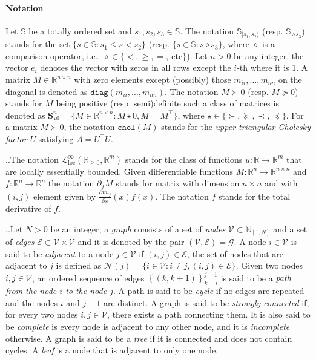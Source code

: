 \documentclass[10pt,twocolumn,twoside]{IEEEtran}
\newcounter{para}
\newcommand\mypara{\par \thesection.\refstepcounter{para}\thepara.\space}
\theoremstyle{plain}
\theoremstyle{definition}
\theoremstyle{remark}
\begin{document}
\paragraph{Notation} Let $\mathbb{S}$ be a totally ordered set and $s_1,s_2,s_3\in\mathbb{S}$. The notation $\mathbb{S}_{[s_1,s_2)}$ (resp. $\mathbb{S}_{\diamond s_3}$) stands for the set $\{s\in\mathbb{S}:s_1\leq s< s_2\}$ (resp. $\{s\in\mathbb{S}:s\diamond s_3\}$, where $\diamond$ is a comparison operator, i.e., $\diamond\in\{<,\geq,=,\ \text{etc}\}$). Let $n>0$ be any integer, the vector $e_i$ denotes the vector with zeros in all rows except the $i$-th where it is 1. A matrix $M\in\mathbb{R}^{n\times n}$ with zero elements except (possibly) those  $m_{ii},\ldots,m_{nn}$ on the diagonal is denoted as $\mathbin{\mathtt{diag}}(m_{ii},\ldots,m_{nn})$. The notation $M\succ 0$ (resp. $M\succeq 0$) stands for $M$ being positive (resp. semi)definite such a class of matrices is denoted as $\mathbf{S}_{\star0}^n=\{M\in\mathbb{R}^{n\times n}:M\star0,M=M^\top\}$, where $\star\in\{\succ,\succeq,\prec,\preceq\}$. For a matrix $M\succ0$, the notation $\mathbin{\mathtt{chol}}(M)$ stands for the \emph{upper-triangular Cholesky factor $U$} satisfying $A=U^\top U$.

\mypara The notation $\mathcal{L}_{\mathrm{loc}}^\infty(\mathbb{R}_{\geq0},\mathbb{R}^m)$ stands for the class of functions $u:\mathbb{R}\to\mathbb{R}^m$ that are locally essentially bounded. Given differentiable functions $M:\mathbb{R}^n\to\mathbb{R}^{n\times n}$ and $f:\mathbb{R}^n\to\mathbb{R}^n$ the notation $\partial_fM$ stands for matrix with dimension $n\times n$ and with $(i,j)$ element given by $\frac{\partial m_{ij}}{\partial x}(x)f(x)$. The notation $\dot{f}$ stands for the total derivative of $f$.

\mypara Let $N>0$ be an integer, a \emph{graph} consists of a set of \emph{nodes} $\mathscr{V}\subset\mathbb{N}_{[1,N]}$ and a set of \emph{edges} $\mathscr{E}\subset\mathscr{V}\times\mathscr{V}$ and it is denoted by the pair $(\mathscr{V},\mathscr{E})=\mathscr{G}$. A node $i\in\mathscr{V}$ is said to be \emph{adjacent} to a node $j\in\mathscr{V}$ if $(i,j)\in\mathscr{E}$, the set of nodes that are adjacent to $j$ is defined as $\mathscr{N}(j)=\{i\in\mathscr{V}:i\neq j,(i,j)\in\mathscr{E}\}$. Given two nodes $i,j\in\mathscr{V}$, an ordered sequence of edges $\left\{(k,k+1)\right\}_{k=i}^{j-1}$ is said to be a \emph{path from the node $i$ to the node $j$}. A path is said to be \emph{cycle} if no edges are repeated and the nodes $i$ and $j-1$  are distinct. A graph is said to be \emph{strongly connected} if, for every two nodes $i,j\in\mathscr{V}$, there exists a path connecting them. It is also said to be \emph{complete} is every node is adjacent to any other node, and it is \emph{incomplete} otherwise. A graph is said to be a \emph{tree} if it is connected and does not contain cycles. A \emph{leaf} is a node that is adjacent to only one node.
\end{document}
